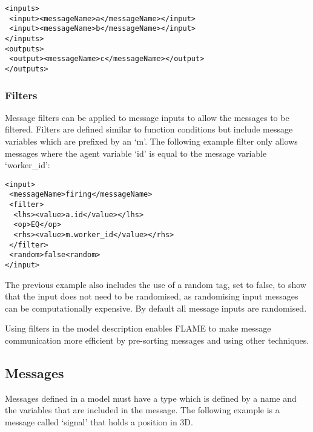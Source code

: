 \begin{mylisting}
\begin{verbatim}
<inputs>
 <input><messageName>a</messageName></input>
 <input><messageName>b</messageName></input>
</inputs>
<outputs>
 <output><messageName>c</messageName></output>
</outputs>
\end{verbatim}
\end{mylisting}

\subsubsection{Filters}\label{sect:msgfilter}
Message filters can be applied to message inputs to allow the messages to be
filtered. Filters are defined similar to function conditions but include
message variables which are prefixed by an `m'. The following example filter only
allows messages where the agent variable `id' is equal to the message variable
`worker\_id':

\begin{mylisting}
\begin{verbatim}
<input>
 <messageName>firing</messageName>
 <filter>
  <lhs><value>a.id</value></lhs>
  <op>EQ</op>
  <rhs><value>m.worker_id</value></rhs>
 </filter>
 <random>false<random>
</input>
\end{verbatim}
\end{mylisting}

The previous example also includes the use of a random tag, set to false, to show
that the input does not need to be randomised, as randomising input messages can be
computationally expensive. By default all message inputs are randomised.

Using filters in the model description enables FLAME to make message
communication more efficient by pre-sorting messages and using other techniques.


\subsection{Messages}

Messages defined in a model must have a type which is defined by a name and the
variables that are included in the message. The following example is a message
called `signal' that holds a position in 3D.

